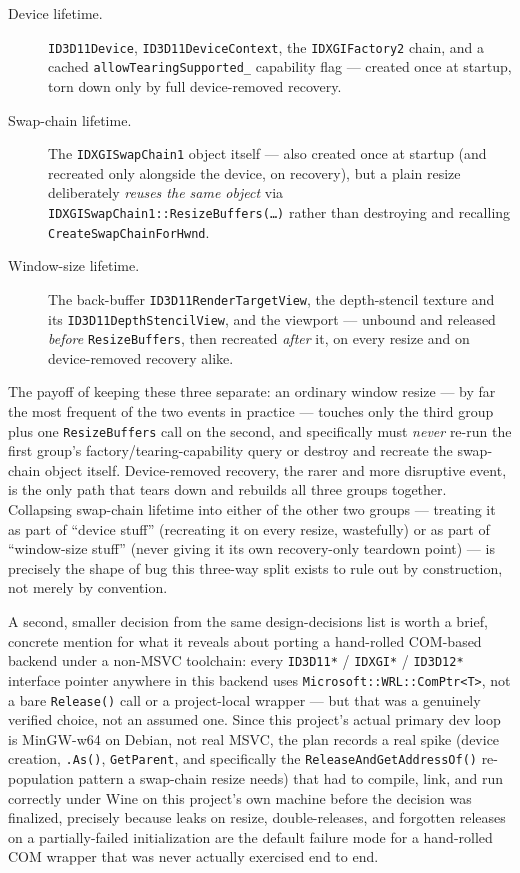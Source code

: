 \begin{description}
  \item[Device lifetime.] \texttt{ID3D11Device}, \texttt{ID3D11DeviceContext}, the
        \texttt{IDXGIFactory2} chain, and a cached \texttt{allowTearingSupported\_} capability
        flag --- created once at startup, torn down only by full device-removed recovery.
  \item[Swap-chain lifetime.] The \texttt{IDXGISwapChain1} object itself --- also created once
        at startup (and recreated only alongside the device, on recovery), but a plain resize
        deliberately \emph{reuses the same object} via
        \texttt{IDXGISwapChain1::ResizeBuffers(\ldots{})} rather than destroying and
        recalling \texttt{CreateSwapChainForHwnd}.
  \item[Window-size lifetime.] The back-buffer \texttt{ID3D11RenderTargetView}, the
        depth-stencil texture and its \texttt{ID3D11DepthStencilView}, and the viewport ---
        unbound and released \emph{before} \texttt{ResizeBuffers}, then recreated
        \emph{after} it, on every resize and on device-removed recovery alike.
\end{description}

The payoff of keeping these three separate: an ordinary window resize --- by far the most
frequent of the two events in practice --- touches only the third group plus one
\texttt{ResizeBuffers} call on the second, and specifically must \emph{never} re-run the first
group's factory/tearing-capability query or destroy and recreate the swap-chain object itself.
Device-removed recovery, the rarer and more disruptive event, is the only path that tears down
and rebuilds all three groups together. Collapsing swap-chain lifetime into either of the other
two groups --- treating it as part of ``device stuff'' (recreating it on every resize, wastefully)
or as part of ``window-size stuff'' (never giving it its own recovery-only teardown point) --- is
precisely the shape of bug this three-way split exists to rule out by construction, not merely
by convention.

A second, smaller decision from the same design-decisions list is worth a brief, concrete
mention for what it reveals about porting a hand-rolled COM-based backend under a non-MSVC
toolchain: every \texttt{ID3D11*} / \texttt{IDXGI*} / \texttt{ID3D12*} interface pointer anywhere in
this backend uses \texttt{Microsoft::WRL::ComPtr<T>}, not a bare \texttt{Release()} call or a
project-local wrapper --- but that was a genuinely verified choice, not an assumed one. Since
this project's actual primary dev loop is MinGW-w64 on Debian, not real MSVC, the plan records a
real spike (device creation, \texttt{.As()}, \texttt{GetParent}, and specifically the
\texttt{ReleaseAndGetAddressOf()} re-population pattern a swap-chain resize needs) that had to
compile, link, and run correctly under Wine on this project's own machine before the decision
was finalized, precisely because leaks on resize, double-releases, and forgotten releases on a
partially-failed initialization are the default failure mode for a hand-rolled COM wrapper that
was never actually exercised end to end.

